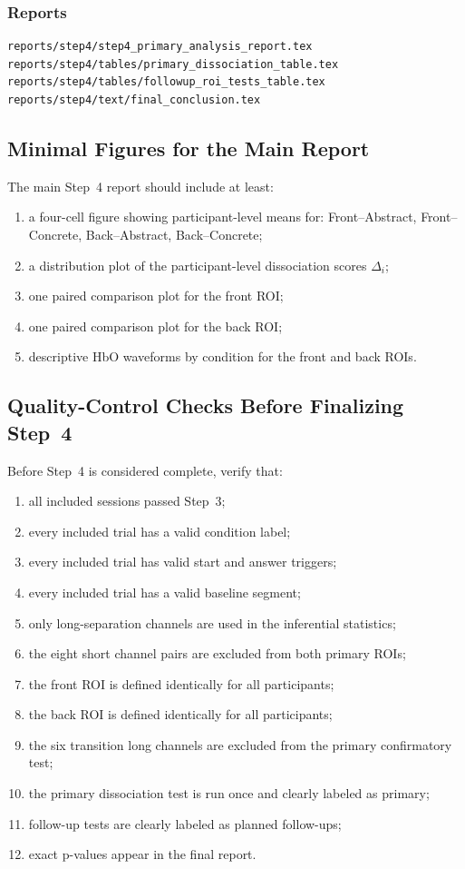 \subsubsection*{Reports}
\begin{verbatim}
reports/step4/step4_primary_analysis_report.tex
reports/step4/tables/primary_dissociation_table.tex
reports/step4/tables/followup_roi_tests_table.tex
reports/step4/text/final_conclusion.tex
\end{verbatim}

\subsection{Minimal Figures for the Main Report}
The main Step~4 report should include at least:
\begin{enumerate}
    \item a four-cell figure showing participant-level means for:
    Front--Abstract, Front--Concrete, Back--Abstract, Back--Concrete;
    \item a distribution plot of the participant-level dissociation scores \(\Delta_i\);
    \item one paired comparison plot for the front ROI;
    \item one paired comparison plot for the back ROI;
    \item descriptive HbO waveforms by condition for the front and back ROIs.
\end{enumerate}

\subsection{Quality-Control Checks Before Finalizing Step~4}
Before Step~4 is considered complete, verify that:
\begin{enumerate}
    \item all included sessions passed Step~3;
    \item every included trial has a valid condition label;
    \item every included trial has valid start and answer triggers;
    \item every included trial has a valid baseline segment;
    \item only long-separation channels are used in the inferential statistics;
    \item the eight short channel pairs are excluded from both primary ROIs;
    \item the front ROI is defined identically for all participants;
    \item the back ROI is defined identically for all participants;
    \item the six transition long channels are excluded from the primary confirmatory test;
    \item the primary dissociation test is run once and clearly labeled as primary;
    \item follow-up tests are clearly labeled as planned follow-ups;
    \item exact p-values appear in the final report.
\end{enumerate}

